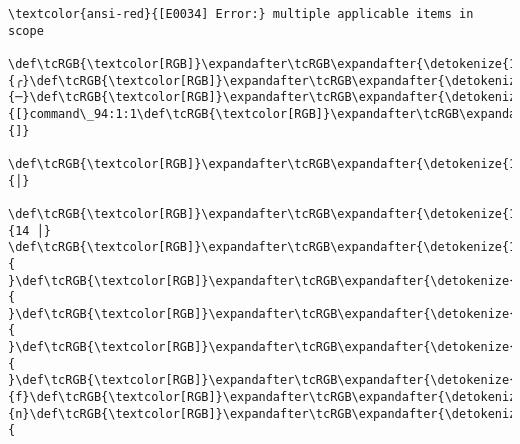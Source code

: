 \documentclass[11pt]{article}
\begin{document}
    \begin{Verbatim}[commandchars=\\\{\}, frame=single, framerule=2mm, rulecolor=\color{outerrorbackground}]
\textcolor{ansi-red}{[E0034] Error:} multiple applicable items in scope
    \def\tcRGB{\textcolor[RGB]}\expandafter\tcRGB\expandafter{\detokenize{148,148,148}}{╭}\def\tcRGB{\textcolor[RGB]}\expandafter\tcRGB\expandafter{\detokenize{148,148,148}}{─}\def\tcRGB{\textcolor[RGB]}\expandafter\tcRGB\expandafter{\detokenize{148,148,148}}{[}command\_94:1:1\def\tcRGB{\textcolor[RGB]}\expandafter\tcRGB\expandafter{\detokenize{148,148,148}}{]}
    \def\tcRGB{\textcolor[RGB]}\expandafter\tcRGB\expandafter{\detokenize{148,148,148}}{│}
 \def\tcRGB{\textcolor[RGB]}\expandafter\tcRGB\expandafter{\detokenize{148,148,148}}{14 │} \def\tcRGB{\textcolor[RGB]}\expandafter\tcRGB\expandafter{\detokenize{178,178,178}}{ }\def\tcRGB{\textcolor[RGB]}\expandafter\tcRGB\expandafter{\detokenize{178,178,178}}{ }\def\tcRGB{\textcolor[RGB]}\expandafter\tcRGB\expandafter{\detokenize{178,178,178}}{ }\def\tcRGB{\textcolor[RGB]}\expandafter\tcRGB\expandafter{\detokenize{178,178,178}}{ }\def\tcRGB{\textcolor[RGB]}\expandafter\tcRGB\expandafter{\detokenize{95,0,135}}{f}\def\tcRGB{\textcolor[RGB]}\expandafter\tcRGB\expandafter{\detokenize{95,0,135}}{n}\def\tcRGB{\textcolor[RGB]}\expandafter\tcRGB\expandafter{\detokenize{95,0,135}}{ 
\end{Verbatim}
\end{document}
